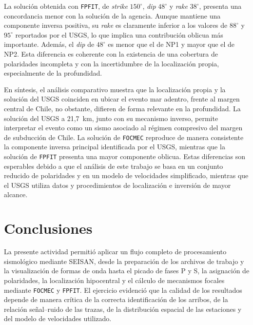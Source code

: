 \documentclass[a4paper,12pt]{article} %
\numberwithin{equation}{section} %
\numberwithin{figure}{section} %
\begin{document}
La solución obtenida con \texttt{FPFIT}, de \textit{strike} $150^\circ$, \textit{dip} $48^\circ$ y \textit{rake} $38^\circ$, presenta una concordancia menor con la solución de la agencia. Aunque mantiene una componente inversa positiva, su \textit{rake} es claramente inferior a los valores de $88^\circ$ y $95^\circ$ reportados por el USGS, lo que implica una contribución oblicua más importante. Además, el \textit{dip} de $48^\circ$ es menor que el de NP1 y mayor que el de NP2. Esta diferencia es coherente con la existencia de una cobertura de polaridades incompleta y con la incertidumbre de la localización propia, especialmente de la profundidad.

En síntesis, el análisis comparativo muestra que la localización propia y la solución del USGS coinciden en ubicar el evento mar adentro, frente al margen central de Chile, no obstante, difieren de forma relevante en la profundidad. La solución del USGS a 21,7~km, junto con su mecanismo inverso, permite interpretar el evento como un sismo asociado al régimen compresivo del margen de subducción de Chile. La solución de \texttt{FOCMEC} reproduce de manera consistente la componente inversa principal identificada por el USGS, mientras que la solución de \texttt{FPFIT} presenta una mayor componente oblicua. Estas diferencias son esperables debido a que el análisis de este trabajo se basa en un conjunto reducido de polaridades y en un modelo de velocidades simplificado, mientras que el USGS utiliza datos y procedimientos de localización e inversión de mayor alcance.

\section{Conclusiones}

La presente actividad permitió aplicar un flujo completo de procesamiento sismológico mediante SEISAN, desde la preparación de los archivos de trabajo y la visualización de formas de onda hasta el picado de fases P y S, la asignación de polaridades, la localización hipocentral y el cálculo de mecanismos focales mediante \texttt{FOCMEC} y \texttt{FPFIT}. El ejercicio evidenció que la calidad de los resultados depende de manera crítica de la correcta identificación de los arribos, de la relación señal--ruido de las trazas, de la distribución espacial de las estaciones y del modelo de velocidades utilizado.
\end{document}
